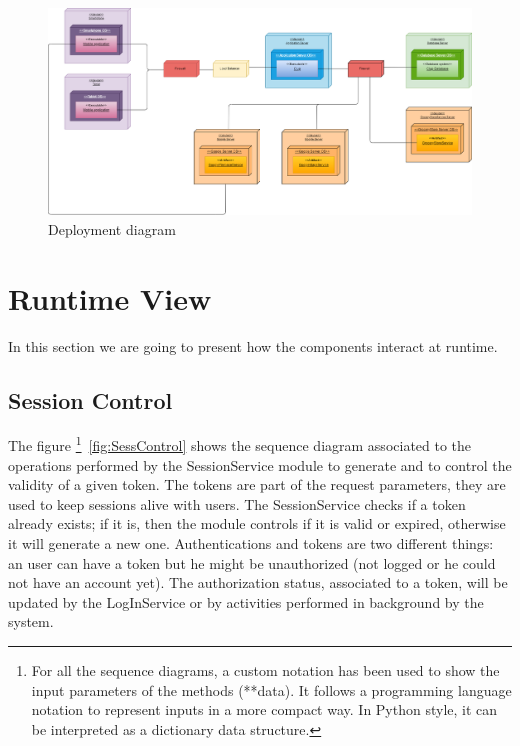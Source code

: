 \begin{figure}[H]
    \centering
    \includegraphics[width=1.0\textwidth]{images/deployment_view.png}
    \caption{Deployment diagram}\label{fig:Deployment diagram}
\end{figure}


\section{Runtime View}

In this section we are going to present how the components interact at runtime.

\subsection{Session Control}

The figure \footnote{For all the sequence diagrams, a custom notation has been used to show the input parameters of the methods (**data). It follows a programming language notation to represent inputs in a more compact way. In Python style, it can be interpreted as a dictionary data structure.}~\ref{fig:SessControl} shows the sequence diagram associated to the operations performed by the SessionService module to generate and to control the validity of a given token. The tokens are part of the request parameters, they are used to keep sessions alive with users. The SessionService checks if a token already exists; if it is, then the module controls if it is valid or expired, otherwise it will generate a new one.
Authentications and tokens are two different things: an user can have a token but he might be unauthorized (not logged or he could not have an account yet). The authorization status, associated to a token, will be updated by the LogInService or by activities performed in background by the system.

